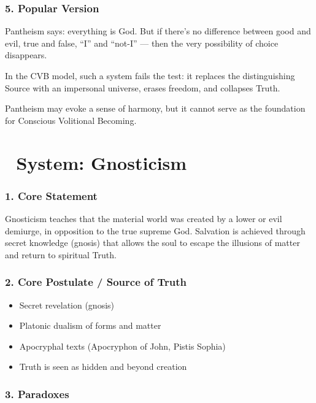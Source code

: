 \documentclass[12pt]{article}
\begin{document}
\subsubsection*{5. Popular Version}

Pantheism says: everything is God. But if there's no difference between good and evil, true and false, ``I'' and ``not-I'' — then the very possibility of choice disappears.

In the CVB model, such a system fails the test: it replaces the distinguishing Source with an impersonal universe, erases freedom, and collapses Truth.

Pantheism may evoke a sense of harmony, but it cannot serve as the foundation for Conscious Volitional Becoming.

\section*{🔷 System: Gnosticism}

\subsubsection*{1. Core Statement}

Gnosticism teaches that the material world was created by a lower or evil demiurge, in opposition to the true supreme God. Salvation is achieved through secret knowledge (gnosis) that allows the soul to escape the illusions of matter and return to spiritual Truth.

\subsubsection*{2. Core Postulate / Source of Truth}

\begin{itemize}
\item Secret revelation (gnosis)
\item Platonic dualism of forms and matter
\item Apocryphal texts (Apocryphon of John, Pistis Sophia)
\item Truth is seen as hidden and beyond creation
\end{itemize}

\subsubsection*{3. Paradoxes}
\end{document}

